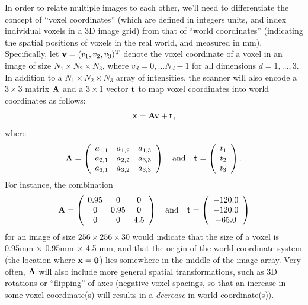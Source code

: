 \documentclass[10pt,twoside]{book}
\begin{document}
%
In order to 
relate 
multiple images 
to each other, we'll need to differentiate the concept of ``voxel coordinates'' (which are defined in integers units, and index individual voxels in a 3D image grid) from that of 
``world coordinates'' (indicating the spatial positions of voxels in the real world, and measured in mm).
%
Specifically, let $\mathbf{v} = (v_1, v_2, v_3)^\mathrm{T}$ denote the voxel coordinate of a voxel in an image of size $N_1 \times N_2 \times N_3$, where $v_d = 0, \ldots N_d-1$ for 
all dimensions 
$d=1, \ldots, 3$. 
%
In addition to a 
$N_1 \times N_2 \times N_3$ 
array of intensities,
the scanner will also encode a $3 \times 3$ matrix $\mathbf{A}$ and a $3 \times 1$ vector $\mathbf{t}$ to map voxel coordinates into world coordinates as follows:
\begin{equation}
\mathbf{x} = \mathbf{A} \mathbf{v} + \mathbf{t}
,
\label{eq:coordinateSystem}
\end{equation}
where
\begin{equation}
\mathbf{A} = 
\left(
\begin{array}{ccc}
a_{1,1} & a_{1,2} & a_{1,3} \\
a_{2,1} & a_{2,2} & a_{3,3} \\
a_{3,1} & a_{3,2} & a_{3,3}
\end{array}
\right)
\quad
\text{and}
\quad
\mathbf{t}
=
\left(
\begin{array}{c}
t_1 \\
t_2 \\
t_3
\end{array}
\right)
.
\label{eq:affineParameterization}
\end{equation}
For instance, the combination 
$$
\mathbf{A} = 
\left(
\begin{array}{ccc}
0.95 & 0    & 0 \\
0    & 0.95 & 0 \\
0    & 0    & 4.5
\end{array}
\right)
\quad
\text{and}
\quad
\mathbf{t}
=
\left(
\begin{array}{c}
-120.0 \\
-120.0 \\
-65.0 \\
\end{array}
\right)
$$
for an image of size $256 \times 256 \times 30$
would indicate that the size of a voxel is 0.95mm $\times$ 0.95mm $\times$ 4.5 mm, and that the origin of the world coordinate system (the location where $\mathbf{x} = \mathbf{0}$) 
lies somewhere in the middle of the image array. Very often, $\mathbf{A}$ will also include more general spatial transformations, such as 3D rotations or ``flipping'' of axes (negative voxel spacings, so that an increase in some voxel coordinate(s) will results in a \emph{decrease} in world coordinate(s)).
\end{document}
